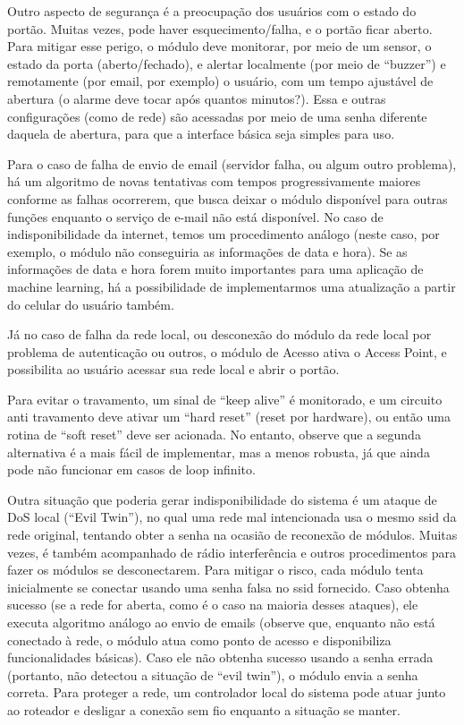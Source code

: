 Outro aspecto de segurança é a preocupação dos usuários com o estado do portão. Muitas vezes, pode haver esquecimento/falha, e o portão ficar aberto. Para mitigar esse perigo, o módulo deve monitorar, por meio de um sensor, o estado da porta (aberto/fechado), e alertar localmente (por meio de “buzzer”) e remotamente (por email, por exemplo) o usuário, com um tempo ajustável de abertura (o alarme deve tocar após quantos minutos?). Essa e outras configurações (como de rede) são acessadas por meio de uma senha diferente daquela de abertura, para que a interface básica seja simples para uso.

Para o caso de falha de envio de email (servidor falha, ou algum outro problema), há um algoritmo de novas tentativas com tempos progressivamente maiores conforme as falhas ocorrerem, que busca deixar o módulo disponível para outras funções enquanto o serviço de e-mail não está disponível. No caso de indisponibilidade da internet, temos um procedimento análogo (neste caso, por exemplo, o módulo não conseguiria as informações de data e hora). Se as informações de data e hora forem muito importantes para uma aplicação de machine learning, há a possibilidade de implementarmos uma atualização a partir do celular do usuário também.

Já no caso de falha da rede local, ou desconexão do módulo da rede local por problema de autenticação ou outros, o módulo de Acesso ativa o Access Point, e possibilita ao usuário acessar sua rede local e abrir o portão.

Para evitar o travamento, um sinal de “keep alive” é monitorado, e um circuito anti travamento deve ativar um “hard reset” (reset por hardware), ou então uma rotina de “soft reset” deve ser acionada. No entanto, observe que a segunda alternativa é a mais fácil de implementar, mas a menos robusta, já que ainda pode não funcionar em casos de loop infinito.

Outra situação que poderia gerar indisponibilidade do sistema é um ataque de DoS local (“Evil Twin”), no qual uma rede mal intencionada usa o mesmo ssid da rede original, tentando obter a senha na ocasião de reconexão de módulos. Muitas vezes, é também acompanhado de rádio interferência e outros procedimentos para fazer os módulos se desconectarem. Para mitigar o risco, cada módulo tenta inicialmente se conectar usando uma senha falsa no ssid fornecido. Caso obtenha sucesso (se a rede for aberta, como é o caso na maioria desses ataques), ele executa algoritmo análogo ao envio de emails (observe que, enquanto não está conectado à rede, o módulo atua como ponto de acesso e disponibiliza funcionalidades básicas). Caso ele não obtenha sucesso usando a senha errada (portanto, não detectou a situação de “evil twin”), o módulo envia a senha correta. Para proteger a rede, um controlador local do sistema pode atuar junto ao roteador  e desligar a conexão sem fio enquanto a situação se manter.

